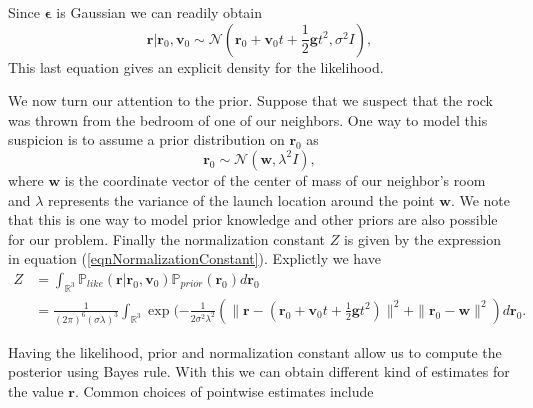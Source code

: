 \documentclass[12pt]{book}
\newcommand{\post}{\mathbb{P}_{post}}
\newcommand{\like}{\mathbb{P}_{like}}
\newcommand{\prior}{\mathbb{P}_{prior}}
\newcommand{\p}{\mathbb{P}}
\begin{document}
Since $\mathbf{\epsilon}$ is Gaussian we can readily obtain \cite{Somersalo}
\begin{equation*}
\textbf{r}|\textbf{r}_{0},\textbf{v}_{0}\sim \mathscr{N}(\textbf{r}_{0}+\textbf{v}_{0}t+\frac{1}{2}\textbf{g}t^{2}
,\sigma^{2} I),
\end{equation*}
This last equation gives an explicit density for the likelihood. 

We now turn our attention to  the prior.
Suppose that we suspect that the rock was thrown from the bedroom of one of our neighbors.
 One way to model this suspicion is to assume a prior distribution on $\textbf{r}_{0}$ as
\begin{equation*}
\textbf{r}_{0}\sim\mathscr{N}(\textbf{w},\lambda^{2} I),
\end{equation*}
where $\textbf{w}$ is the coordinate vector of the center of mass of our neighbor's room and $\lambda$ represents 
the variance of the launch location around the point $\textbf{w}$. We note that  this is one way to model 
 prior knowledge and other priors are also possible for our problem. Finally the normalization constant $Z$
is given by the expression in equation (\ref{eqnNormalizationConstant}). Explictly we have
\begin{align*}
Z&=\int_{\mathbb{R}^{3}}\like(\textbf{r}|\textbf{r}_{0},\textbf{v}_{0})
\prior(\textbf{r}_{0})d\textbf{r}_{0}\\
&= \frac{1}{(2\pi)^{6}(\sigma\lambda)^{3}}\int_{\mathbb{R}^{3}}
\exp(-\frac{1}{2\sigma^{2}\lambda^{2}}
\left(\|\textbf{r}-(\textbf{r}_{0}+\textbf{v}_{0}t+\frac{1}{2}\textbf{g}t^{2})\|^{2}
+\|\textbf{r}_{0}-\textbf{w}\|^{2}\right)d\textbf{r}_{0}.
\end{align*}


Having the likelihood, prior and normalization constant allow us to compute the posterior using
Bayes rule. With this we can obtain different kind of estimates for the value $\textbf{r}$.  
Common choices of pointwise estimates include
\end{document}
